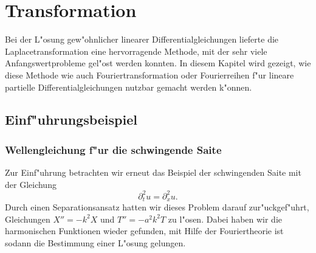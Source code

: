 %
%
%
\chapter{Transformation}
Bei der L"osung gew"ohnlicher linearer Differentialgleichungen lieferte die
Laplacetransformation eine hervorragende Methode, mit der sehr
viele Anfangswertprobleme gel"ost werden konnten.
In diesem Kapitel wird gezeigt, wie diese Methode wie auch
Fouriertransformation oder Fourierreihen 
f"ur lineare partielle Differentialgleichungen nutzbar gemacht
werden k"onnen.

\section{Einf"uhrungsbeispiel}
\subsection{Wellengleichung f"ur die schwingende Saite}
Zur Einf"uhrung betrachten wir erneut das Beispiel der
schwingenden Saite mit der Gleichung
$$\partial_t^2u=\partial_x^2u.$$
Durch einen Separationsansatz hatten wir dieses Problem
darauf zur"uckgef"uhrt, Gleichungen $X''=-k^2X$ und $T''=-a^2k^2T$
zu l"osen.
Dabei haben wir die harmonischen Funktionen wieder gefunden,
mit Hilfe der Fouriertheorie ist sodann die Bestimmung einer L"osung
gelungen.

